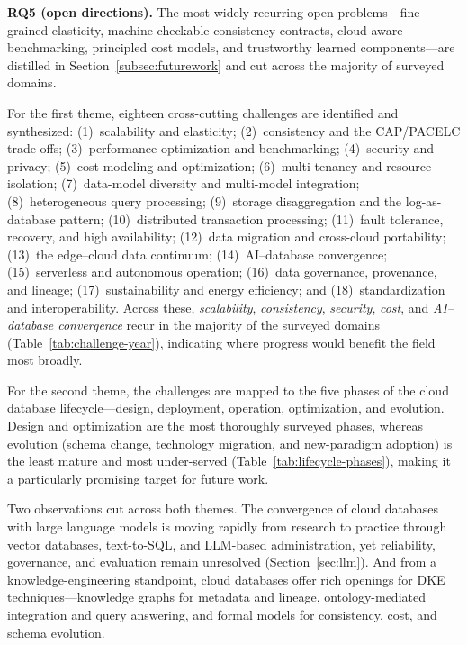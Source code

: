 \documentclass[a4paper,fleqn]{cas-sc}
\begin{document}
\noindent\textbf{RQ5 (open directions).} The most widely recurring open problems---fine-grained elasticity, machine-checkable consistency contracts, cloud-aware benchmarking, principled cost models, and trustworthy learned components---are distilled in Section~\ref{subsec:futurework} and cut across the majority of surveyed domains.

For the first theme, eighteen cross-cutting challenges are identified and synthesized: (1)~scalability and elasticity; (2)~consistency and the CAP/PACELC trade-offs; (3)~performance optimization and benchmarking; (4)~security and privacy; (5)~cost modeling and optimization; (6)~multi-tenancy and resource isolation; (7)~data-model diversity and multi-model integration; (8)~heterogeneous query processing; (9)~storage disaggregation and the log-as-database pattern; (10)~distributed transaction processing; (11)~fault tolerance, recovery, and high availability; (12)~data migration and cross-cloud portability; (13)~the edge--cloud data continuum; (14)~AI--database convergence; (15)~serverless and autonomous operation; (16)~data governance, provenance, and lineage; (17)~sustainability and energy efficiency; and (18)~standardization and interoperability. Across these, \emph{scalability}, \emph{consistency}, \emph{security}, \emph{cost}, and \emph{AI--database convergence} recur in the majority of the surveyed domains (Table~\ref{tab:challenge-year}), indicating where progress would benefit the field most broadly.

For the second theme, the challenges are mapped to the five phases of the cloud database lifecycle---design, deployment, operation, optimization, and evolution. Design and optimization are the most thoroughly surveyed phases, whereas evolution (schema change, technology migration, and new-paradigm adoption) is the least mature and most under-served (Table~\ref{tab:lifecycle-phases}), making it a particularly promising target for future work.

Two observations cut across both themes. The convergence of cloud databases with large language models is moving rapidly from research to practice through vector databases, text-to-SQL, and LLM-based administration, yet reliability, governance, and evaluation remain unresolved (Section~\ref{sec:llm}). And from a knowledge-engineering standpoint, cloud databases offer rich openings for DKE techniques---knowledge graphs for metadata and lineage, ontology-mediated integration and query answering, and formal models for consistency, cost, and schema evolution.
\end{document}

